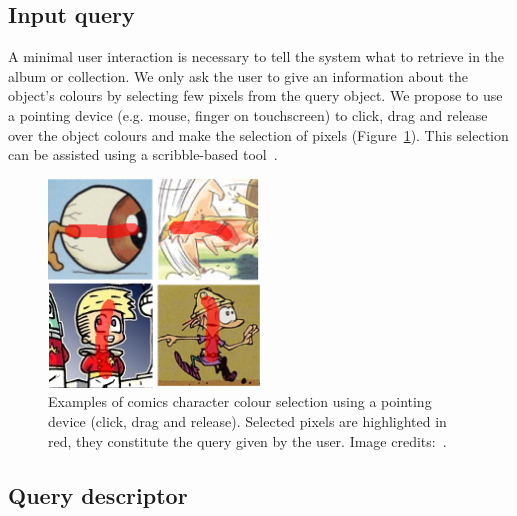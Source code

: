 

\subsection{Input query}
\label{sec:in:input_query}
A minimal user interaction is necessary to tell the system what to retrieve in the album or collection.
We only ask the user to give an information about the object's colours by selecting few pixels from the query object.
We propose to use a pointing device (e.g. mouse, finger on touchscreen) to click, drag and release over the object colours and make the selection of pixels (Figure~\ref{fig:in:user_selection}).
This selection can be assisted using a scribble-based tool~\cite{Xu2012LazySelection}.

 \begin{figure}[!ht]	%
 	 \centering
 	\includegraphics[width=0.5\textwidth]{user_selection.png}
 	\caption[User defined comics character selection]{Examples of comics character colour selection using a pointing device (click, drag and release). Selected pixels are highlighted in red, they constitute the query given by the user. Image credits:~\cite{Noeils11,Bubble08,Midam01,Prunelle10}. }
 	\label{fig:in:user_selection}
 \end{figure}

\subsection{Query descriptor}

